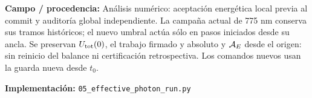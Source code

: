 \documentclass[11pt,a4paper]{article}
\newcommand{\sourcecode}[1]{\par{\footnotesize\color{ink}\textbf{Implementación:} \texttt{#1}}\par}
\newcommand{\origin}[1]{\par{\footnotesize\color{ink}\textbf{Campo / procedencia:} #1}\par}
\begin{document}
\vfill
\origin{Análisis numérico: aceptación energética local previa al commit y auditoría global independiente. La campaña actual de 775 nm conserva sus tramos históricos; el nuevo umbral actúa sólo en pasos iniciados desde su ancla. Se preservan $U_{\rm tot}(0)$, el trabajo firmado y absoluto y $ {\cal A}_E$ desde el origen: sin reinicio del balance ni certificación retrospectiva. Los comandos nuevos usan la guarda nueva desde $t_0$.}
\sourcecode{05\_effective\_photon\_run.py}
\end{document}
